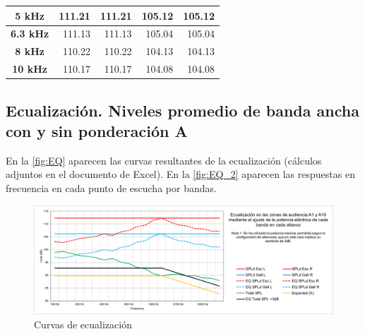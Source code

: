 \documentclass{article}
\begin{document}
\begin{table}[htbp]
\begin{tabular}{|c|r|r|r|r|}
        \rowcolor[rgb]{ .439,  .678,  .278} \textcolor[rgb]{ 1,  1,  1}{\textbf{5 kHz }}    & \cellcolor[rgb]{ 1,  1,  1}111.21                                & \cellcolor[rgb]{ .886,  .937,  .855}111.21                       & \cellcolor[rgb]{ 1,  1,  1}105.12                                 & \cellcolor[rgb]{ .886,  .937,  .855}105.12 \bigstrut                        \\        \hline
        \rowcolor[rgb]{ .439,  .678,  .278} \textcolor[rgb]{ 1,  1,  1}{\textbf{6.3 kHz }}  & \cellcolor[rgb]{ 1,  1,  1}111.13                                & \cellcolor[rgb]{ .886,  .937,  .855}111.13                       & \cellcolor[rgb]{ 1,  1,  1}105.04                                 & \cellcolor[rgb]{ .886,  .937,  .855}105.04 \bigstrut                        \\        \hline
        \rowcolor[rgb]{ .439,  .678,  .278} \textcolor[rgb]{ 1,  1,  1}{\textbf{8 kHz }}    & \cellcolor[rgb]{ 1,  1,  1}110.22                                & \cellcolor[rgb]{ .886,  .937,  .855}110.22                       & \cellcolor[rgb]{ 1,  1,  1}104.13                                 & \cellcolor[rgb]{ .886,  .937,  .855}104.13 \bigstrut                        \\        \hline
        \rowcolor[rgb]{ .439,  .678,  .278} \textcolor[rgb]{ 1,  1,  1}{\textbf{10 kHz }}   & \cellcolor[rgb]{ 1,  1,  1}110.17                                & \cellcolor[rgb]{ .886,  .937,  .855}110.17                       & \cellcolor[rgb]{ 1,  1,  1}104.08                                 & \cellcolor[rgb]{ .886,  .937,  .855}104.08 \bigstrut                        \\        \hline
    \end{tabular}%
    \label{tab:balance_potencias}%
\end{table}%


\subsection{Ecualización. Niveles promedio de banda ancha con y sin ponderación A}

En la \autoref{fig:EQ} aparecen las curvas resultantes de la ecualización (cálculos adjuntos en el documento de Excel). En la \autoref{fig:EQ_2} aparecen las respuestas en frecuencia en cada punto de escucha por bandas.

\begin{figure}[hbtp]
    \centering
    \includegraphics[width=\linewidth]{Para la memoria/EQ.png}
    \caption{Curvas de ecualización}
    \label{fig:EQ}
\end{figure}
\end{document}
